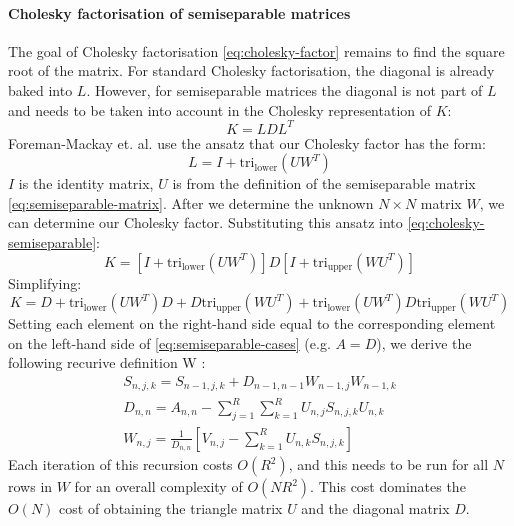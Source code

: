 \paragraph{Cholesky factorisation of semiseparable matrices}
The goal of Cholesky factorisation \ref{eq:cholesky-factor} remains to find the square root of the matrix. For standard Cholesky factorisation, the diagonal is already baked into $L$. However, for semiseparable matrices the diagonal is not part of $L$ and needs to be taken into account in the Cholesky representation of $K$:
\begin{equation} \label{eq:cholesky-semiseparable}
    K = L D L^T
\end{equation}
Foreman-Mackay et. al. \cite{foreman-mackay} use the ansatz that our Cholesky factor has the form:
\begin{equation*}
    L = I + \text{tri}_{\text{lower}}(U W^T)
\end{equation*}
$I$ is the identity matrix, $U$ is from the definition of the semiseparable matrix \ref{eq:semiseparable-matrix}. After we determine the unknown $N \times N$ matrix $W$, we can determine our Cholesky factor. Substituting this ansatz into \ref{eq:cholesky-semiseparable}:
\begin{equation*}
    K = [I + \text{tri}_{\text{lower}}(U W^T)] D [I + \text{tri}_{\text{upper}}(W U^T)]
\end{equation*}
Simplifying:
\begin{equation*}
    K = D + \text{tri}_{\text{lower}}(U W^T) D + D \text{tri}_{\text{upper}}(W U^T) + \text{tri}_{\text{lower}}(U W^T) D \text{tri}_{\text{upper}}(W U^T)
\end{equation*}
Setting each element on the right-hand side equal to the corresponding element on the left-hand side of \ref{eq:semiseparable-cases} (e.g. $A = D$), we derive the following recurive definition W \cite{foreman-mackay}:
\begin{equation*}
    \begin{aligned}
        S_{n,j,k} = S_{n-1, j, k} + D_{n-1, n-1} W_{n-1,j} W_{n-1, k} \\
        D_{n,n} = A_{n,n} - \sum_{j=1}^{R} \sum_{k=1}^{R} U_{n,j} S_{n,j,k} U_{n,k} \\
        W_{n,j} = \frac{1}{D_{n,n}} \left[ V_{n,j} - \sum_{k=1}^{R} U_{n,k} S_{n,j,k} \right]
    \end{aligned}
\end{equation*}
Each iteration of this recursion costs $O(R^2)$, and this needs to be run for all $N$ rows in $W$ for an overall complexity of $O(N R^2)$. This cost dominates the $O(N)$ cost of obtaining the triangle matrix $U$ and the diagonal matrix $D$. 


